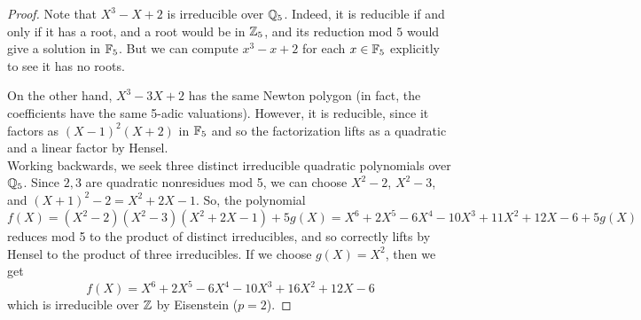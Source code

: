\begin{proof}
	Note that $X^3-X+2$ is irreducible over $\mathbb{Q}_5$. Indeed, it is reducible if and only if it has a root, and a root would be in $\mathbb{Z}_5$, and its reduction mod $5$ would give a solution in $\mathbb{F}_5$. But we can compute $x^3-x+2$ for each $x \in \mathbb{F}_5$ explicitly to see it has no roots.
	
	On the other hand, $X^3-3X+2$ has the same Newton polygon (in fact, the coefficients have the same 5-adic valuations). However, it is reducible, since it factors as $(X-1)^2(X+2)$ in $\mathbb{F}_5$ and so the factorization lifts as a quadratic and a linear factor by Hensel. \\
	
	Working backwards, we seek three distinct irreducible quadratic polynomials over $\mathbb{Q}_5$. Since $2,3$ are quadratic nonresidues mod 5, we can choose $X^2-2$, $X^2-3$, and $(X+1)^2-2 = X^2+2X-1$. So, the polynomial
	\[ f(X) = (X^2-2)(X^2-3)(X^2+2X-1)+5g(X) = X^6+2X^5-6X^4-10X^3+11X^2+12X-6+5g(X) \]
	reduces mod 5 to the product of distinct irreducibles, and so correctly lifts by Hensel to the product of three irreducibles. If we choose $g(X) = X^2$, then we get
	\[ f(X) = X^6 + 2X^5 - 6X^4 - 10X^3 + 16X^2 + 12X - 6 \]
	which is irreducible over $\mathbb{Z}$ by Eisenstein ($p=2$).
\end{proof}
